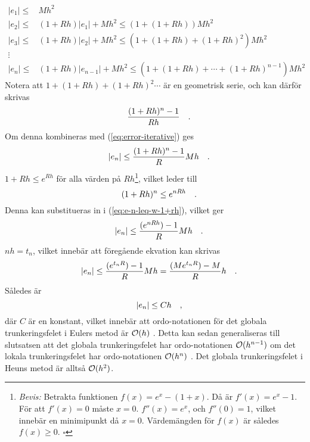 \begin{equation}\label{eq:error-iterative}
    \begin{split}
        |e_1|\leq& Mh^2\\
        |e_2|\leq& (1+Rh)|e_1|+Mh^2 \leq (1+(1+Rh))Mh^2\\
        |e_3|\leq& (1+Rh)|e_2|+Mh^2 \leq (1+(1+Rh)+(1+Rh)^2)Mh^2\\
        \vdots&\\
        |e_n|\leq& (1+Rh)|e_{n-1}|+Mh^2 \leq (1+(1+Rh)+\cdots +(1+Rh)^{n-1})Mh^2
    \end{split}
\end{equation} Notera att \(1+(1+Rh)+(1+Rh)^2\cdots\) är en geometrisk serie, och kan därför skrivas
\begin{equation}
    \frac{(1+Rh)^n-1}{Rh}
\quad\mathrm{.}\!\!\!\!\!\!\end{equation} Om denna kombineras med (\ref{eq:error-iterative}) ges
\begin{equation}\label{eq:e-n-leq-w-1+rh}
    |e_n|\leq \frac{(1+Rh)^n-1}{R}Mh
\quad\mathrm{.}\!\!\!\!\!\!\end{equation} \(1+Rh\leq e^{Rh}\) för alla värden på \(Rh\)\footnote{\textit{Bevis:} Betrakta funktionen \(f(x)=e^x-(1+x)\). Då är \(f'(x)=e^x-1\). För att \(f'(x)=0\) måste \(x=0\). \(f''(x)=e^x\), och \(f''(0)=1\), vilket innebär en minimipunkt då \(x=0\). Värdemängden för \(f(x)\) är således \(f(x)\geq 0\). \(\square\)}, vilket leder till
\begin{equation}
    (1+Rh)^n\leq e^{nRh}
\quad\mathrm{.}\!\!\!\!\!\!\end{equation} Denna kan substitueras in i (\ref{eq:e-n-leq-w-1+rh}), vilket ger
\begin{equation}
    |e_n|\leq \frac{(e^{nRh})-1}{R}Mh
\quad\mathrm{.}\!\!\!\!\!\!\end{equation} \(nh=t_n\), vilket innebär att föregående ekvation kan skrivas
\begin{equation}
    |e_n|\leq \frac{(e^{t_nR})-1}{R}Mh=\frac{(Me^{t_nR})-M}{R}h
\quad\mathrm{.}\!\!\!\!\!\!\end{equation} Således är
\begin{equation}
    |e_n|\leq Ch
\quad\mathrm{,}\!\!\!\!\!\!\end{equation} där \(C\) är en konstant, vilket innebär att ordo-notationen för det globala trunkeringsfelet i Eulers metod är \(\mathcal{O}(h)\) \parencites{trench_31_2020}{feldman_d22_nodate}. Detta kan sedan generaliseras till slutsatsen att det globala trunkeringsfelet har ordo-notationen \(\mathcal{O}(h^{n-1})\) om det lokala trunkeringsfelet har ordo-notationen \(\mathcal{O}(h^n)\) \parencite[370]{zill_differential_2005}. Det globala trunkeringsfelet i Heuns metod är alltså \(\mathcal{O}(h^2)\).

